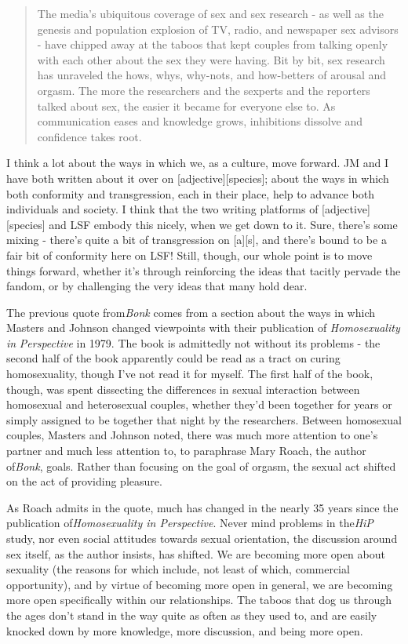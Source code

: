 \begin{quote}
The media's ubiquitous coverage of sex and sex research - as well as the genesis and population explosion of TV, radio, and newspaper sex advisors - have chipped away at the taboos that kept couples from talking openly with each other about the sex they were having. Bit by bit, sex research has unraveled the hows, whys, why-nots, and how-betters of arousal and orgasm. The more the researchers and the sexperts and the reporters talked about sex, the easier it became for everyone else to. As communication eases and knowledge grows, inhibitions dissolve and confidence takes root{.}
\end{quote}

I think a lot about the ways in which we, as a culture, move forward. JM and I have both written about it over on {[}adjective{]}{[}species{]}; about the ways in which both conformity and transgression, each in their place, help to advance both individuals and society. I think that the two writing platforms of {[}adjective{]}{[}species{]} and LSF embody this nicely, when we get down to it. Sure, there's some mixing - there's quite a bit of transgression on {[}a{]}{[}s{]}, and there's bound to be a fair bit of conformity here on LSF! Still, though, our whole point is to move things forward, whether it's through reinforcing the ideas that tacitly pervade the fandom, or by challenging the very ideas that many hold dear.

The previous quote from\emph{Bonk} comes from a section about the ways in which Masters and Johnson changed viewpoints with their publication of \emph{Homosexuality in} \emph{Perspective} in 1979. The book is admittedly not without its problems - the second half of the book apparently could be read as a tract on curing homosexuality, though I've not read it for myself. The first half of the book, though, was spent dissecting the differences in sexual interaction between homosexual and heterosexual couples, whether they'd been together for years or simply assigned to be together that night by the researchers. Between homosexual couples, Masters and Johnson noted, there was much more attention to one's partner and much less attention to, to paraphrase Mary Roach, the author of\emph{Bonk}, goals. Rather than focusing on the goal of orgasm, the sexual act shifted on the act of providing pleasure.

As Roach admits in the quote, much has changed in the nearly 35 years since the publication of\emph{Homosexuality in Perspective}. Never mind problems in the\emph{HiP} study, nor even social attitudes towards sexual orientation, the discussion around sex itself, as the author insists, has shifted. We are becoming more open about sexuality (the reasons for which include, not least of which, commercial opportunity), and by virtue of becoming more open in general, we are becoming more open specifically within our relationships. The taboos that dog us through the ages don't stand in the way quite as often as they used to, and are easily knocked down by more knowledge, more discussion, and being more open.


